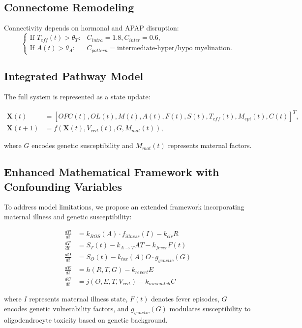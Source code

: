 \documentclass[11pt]{article}
\let\oldsubsection\subsection
\renewcommand{\subsection}[1]{\oldsubsection{#1}\setlength{\leftskip}{0.75em}}
\begin{document}
\subsection{Connectome Remodeling}
Connectivity depends on hormonal and APAP disruption:
\[
\begin{cases}
\text{If } T_{eff}(t) > \theta_T: & C_{intra} = 1.8, C_{inter} = 0.6, \\
\text{If } A(t) > \theta_A: & C_{pattern} = \text{intermediate-hyper/hypo myelination}.
\end{cases}
\]

\subsection{Integrated Pathway Model}
The full system is represented as a state update:

\begin{align}
\mathbf{X}(t) &= [OPC(t), OL(t), M(t), A(t), F(t), S(t), T_{eff}(t), M_{epi}(t), C(t)]^T, \\
\mathbf{X}(t+1) &= f(\mathbf{X}(t), V_{crit}(t), G, M_{mat}(t)),
\end{align}

where $G$ encodes genetic susceptibility and $M_{mat}(t)$ represents maternal factors.

\subsection{Enhanced Mathematical Framework with Confounding Variables}

To address model limitations, we propose an extended framework incorporating maternal illness and genetic susceptibility:

\begin{align}
\frac{dR}{dt} &= k_{ROS}(A) \cdot f_{illness}(I) - k_{clr}R \\
\frac{dT}{dt} &= S_T(t) - k_{A \rightarrow T}AT - k_{fever}F(t) \\
\frac{dO}{dt} &= S_O(t) - k_{tox}(A)O \cdot g_{genetic}(G) \\
\frac{dE}{dt} &= h(R, T, G) - k_{revert}E \\
\frac{dC}{dt} &= j(O, E, T, V_{crit}) - k_{mismatch}C
\end{align}

where $I$ represents maternal illness state, $F(t)$ denotes fever episodes, $G$ encodes genetic vulnerability factors, and $g_{genetic}(G)$ modulates susceptibility to oligodendrocyte toxicity based on genetic background.
\end{document}
